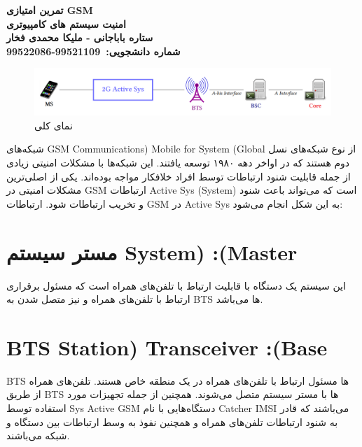 \def \Subject {تمرین امتیازی GSM}
\def \Course { امنیت سیستم های کامپیوتری}
\def \Author {ستاره باباجانی - ملیکا محمدی فخار}
\def \StudentNumber {99521109-99522086}

\begin{center}
\vspace{.4cm}
{\bf {\huge \Subject}}\\
\vspace{.3cm}
{\bf \Large \Course}\\
\vspace{.2cm}
{\bf \Author }  \\
{\bf شماره دانشجویی:\ \StudentNumber}\\
\end{center}

\hspace{\fill} 



\clearpage

\begin{figure}[h!]
    \centering
    \includegraphics[width=0.9\linewidth]{images/1.png}
    \caption{نمای کلی}
    \label{fig:GSM}
\end{figure}


شبکه‌های GSM  Communications) Mobile for System (Global    از نوع شبکه‌های نسل دوم هستند که در اواخر دهه ۱۹۸۰ توسعه یافتند. این شبکه‌ها با مشکلات امنیتی زیادی از جمله قابلیت شنود ارتباطات توسط افراد خلافکار مواجه بوده‌اند. یکی از اصلی‌ترین مشکلات امنیتی در GSM ارتباطات Active Sys (System) است که می‌تواند باعث شنود و تخریب ارتباطات شود.
ارتباطات GSM در Active Sys به این شکل انجام می‌شود:



\section{مستر سیستم System) :(Master }
این سیستم یک دستگاه با قابلیت ارتباط با تلفن‌های همراه است که مسئول برقراری ارتباط با تلفن‌های همراه و نیز متصل شدن به BTS ها می‌باشد.

\section{BTS Station) Transceiver :(Base   }
BTS ها مسئول ارتباط با تلفن‌های همراه در یک منطقه خاص هستند.
تلفن‌های همراه از طریق BTS ها با مستر سیستم متصل می‌شوند.
همچنین از جمله تجهیزات مورد استفاده توسط Sys Active GSM دستگاه‌هایی با نام Catcher IMSI می‌باشند که قادر به شنود ارتباطات تلفن‌های همراه و همچنین نفوذ به وسط ارتباطات بین دستگاه و شبکه می‌باشند.



